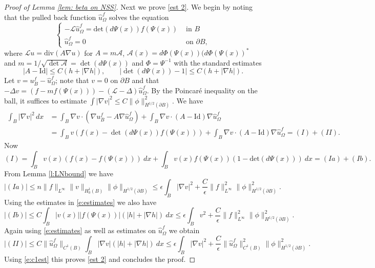 \documentclass[10pt,a4paper]{amsart}
\numberwithin{equation}{section}
\def\W{\Omega}
\begin{document}
\begin{proof}[Proof of Lemma \ref{lem: beta on NSS}]
	
	Next we prove \eqref{est 2}. We begin by noting that the pulled back function $\hat{u}^f_\W$ solves the equation
	\[
	\begin{cases}
		-\mathcal{L} \hat{u}^f_\W = \text{det} (d\Psi(x))f(\Psi(x))  & \text{ in } B\\
		\hat{u}^f_\W =0 & \text{ on } \partial B, 
	\end{cases}
	\]
	where $\mathcal{L}u = \text{div}(A \nabla u)$ for $A = m\mathcal{A}$, $\mathcal{A}(x) = d\Phi(\Psi (x) ) (d\Phi (\Psi(x))^*$ and $m = 1/\sqrt{\det \mathcal A}=\det(d \Psi(x))$ and $\Phi = \Psi^{-1}$ with the standard estimates 
	\begin{equation} \label{e:estimates}
	|A -\text{Id}| \leq C(h +|\nabla h|) , \qquad |\det(d\Psi(x))-1| \leq C(h+ |\nabla h|). 
	\end{equation}
	Let $v = u^f_B - \hat{u}^f_\W$; note that $v=0$ on $\partial B$ and that $-\Delta v = (f-mf(\Psi(x))) - (\mathcal{L}-\Delta)\hat{u}^f_\W. $ By the Poincar\'{e} inequality on the ball, it suffices to estimate $\int |\nabla v|^2 \leq C \| \phi \|_{H^{1/2}(\partial B)}^2.$ We have
	\begin{align*}
		 \int_B |\nabla v|^2\,dx& = \int_B \nabla v \cdot ( \nabla u^f_B - A\nabla \hat{u}^f_\W ) + \int_B \nabla v \cdot (A- \text{Id} ) \nabla \hat{u}^f_\W \\ 
   &=\int_B v \left( f(x)-\det(d \Psi(x))f(\Psi(x))\right) + \int_B \nabla v \cdot (A- \text{Id} ) \nabla \hat{u}^f_\W = (I) + (II). 
	\end{align*}
 Now 
 \[
 (I) = \int_{B} v(x) (f(x)-f(\Psi(x))) \ dx + \int_{B}v(x)f(\Psi(x))(1-\text{det} (d \Psi(x)))\ dx= (Ia)+ (Ib). 
 \]
 From Lemma \ref{l:LNbound} we have 
 \[
 |(Ia)|\leq n \| f \|_{L^{\infty}} \| v \|_{H_0^1(B)} \| \phi \|_{H^{1/2}(\partial B)}
 \leq \epsilon \int_{B} |\nabla v|^2 + \frac{C}{\epsilon} \| f \|^2_{L^{\infty}} \| \phi \|^2_{H^{1/2}(\partial B)}. 
 \]
 Using the estimates in \eqref{e:estimates} we also have 
 \[
 |(Ib)| \leq C \int_{B} |v(x)| |f(\Psi(x))| (|h| + |\nabla h|) \ dx 
 \leq \epsilon \int_{B} v^2 + \frac{C}{\epsilon} \| f \|^2_{L^{\infty}} \| \phi \|^2_{H^{1/2}(\partial B)}. 
 \]
 Again using \eqref{e:estimates} as well as estimates on $\hat{u}^f_{\Omega}$ we obtain 
 \[
 |(II)| \leq C \| \hat{u}^f_{\Omega} \|_{C^1(B)} \int_{B} |\nabla v| (|h|+ |\nabla h|) \ dx 
 \leq \epsilon \int_{B} |\nabla v|^2 + \frac{C}{\epsilon}  \| \hat{u}^f_{\Omega} \|^2_{C^1(B)} \| \phi \|^2_{H^{1/2}(\partial B)}. 
 \]
 Using \eqref{e:c1est} this proves \eqref{est 2} and concludes the proof. 
 \end{proof}
\end{document}
